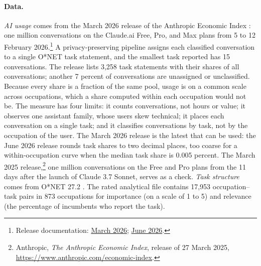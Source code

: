 \documentclass[12pt]{article}
\theoremstyle{plain}
\theoremstyle{definition}
\theoremstyle{remark}
\begin{document}
\paragraph{Data.}
\emph{AI usage} comes from the March 2026 release of the Anthropic
Economic Index \citep{MassenkoffEtAl2026AEI}: one million conversations
on the Claude.ai Free, Pro, and Max plans from 5 to 12 February 2026.\footnote{%
Release documentation:
\href{https://huggingface.co/datasets/Anthropic/EconomicIndex/blob/main/release_2026_03_24/data_documentation.md}{March 2026};
\href{https://huggingface.co/datasets/Anthropic/EconomicIndex/blob/main/release_2026_06_26/data_documentation.md}{June 2026}.}
A privacy-preserving pipeline assigns each classified conversation to a single O*NET
task statement, and the smallest task
reported has 15 conversations. The release lists 3,258 task statements
with their shares of all conversations; another 7 percent of
conversations are unassigned or unclassified. Because every
share is a fraction of the same pool, usage is on a common scale across
occupations, which a share computed within each occupation would not be.
The measure has four limits: it counts conversations, not hours or
value; it observes one assistant family, whose users skew technical; it
places each conversation on a single task; and it classifies
conversations by task, not by the occupation of the user. The March 2026 release is
the latest that can be used: the June 2026 release rounds task shares to
two decimal places, too coarse for a within-occupation curve when the
median task share is 0.005 percent. The March 2025 release,\footnote{%
Anthropic, \emph{The Anthropic Economic Index}, release of 27 March
2025, \url{https://www.anthropic.com/economic-index}.} one million
conversations on the Free
and Pro plans from the 11 days after the launch of Claude 3.7 Sonnet,
serves as a check. \emph{Task structure} comes from O*NET 27.2
\citep{ONET272}. The rated analytical file contains 17,953
occupation--task pairs in 873 occupations
for importance (on a scale of 1 to 5) and relevance (the percentage of
incumbents who report the task).
\end{document}
